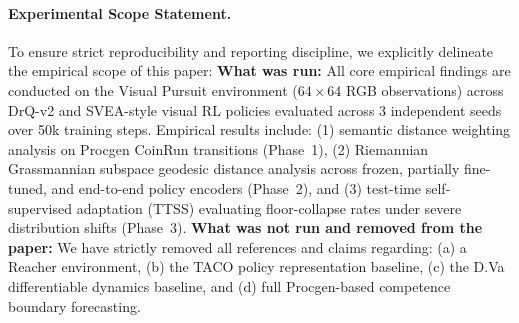 
\paragraph{Experimental Scope Statement.}
To ensure strict reproducibility and reporting discipline, we explicitly delineate the empirical scope of this paper:
\textbf{What was run:}
All core empirical findings are conducted on the Visual Pursuit environment ($64\times 64$ RGB observations) across DrQ-v2 and SVEA-style visual RL policies evaluated across 3 independent seeds over 50k training steps.
Empirical results include: (1) semantic distance weighting analysis on Procgen CoinRun transitions (Phase~1), (2) Riemannian Grassmannian subspace geodesic distance analysis across frozen, partially fine-tuned, and end-to-end policy encoders (Phase~2), and (3) test-time self-supervised adaptation (TTSS) evaluating floor-collapse rates under severe distribution shifts (Phase~3).
\textbf{What was not run and removed from the paper:}
We have strictly removed all references and claims regarding: (a) a Reacher environment, (b) the TACO policy representation baseline, (c) the D.Va differentiable dynamics baseline, and (d) full Procgen-based competence boundary forecasting.
